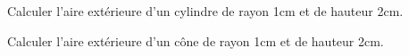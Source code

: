 
Calculer l'aire extérieure d'un cylindre de rayon 1cm et de hauteur 2cm.


Calculer l'aire extérieure d'un cône de rayon 1cm et de hauteur 2cm.